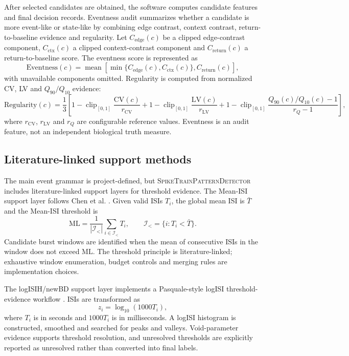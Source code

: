 \documentclass[pdflatex,sn-apa]{sn-jnl}
\newcommand{\stpd}{\textsc{SpikeTrainPatternDetector}}
\begin{document}
After selected candidates are obtained, the software computes candidate features and final decision records. Eventness audit summarizes whether a candidate is more event-like or state-like by combining edge contrast, context contrast, return-to-baseline evidence and regularity. Let $C_{\mathrm{edge}}(c)$ be a clipped edge-contrast component, $C_{\mathrm{ctx}}(c)$ a clipped context-contrast component and $C_{\mathrm{return}}(c)$ a return-to-baseline score. The eventness score is represented as
\begin{equation}
    \mathrm{Eventness}(c)
    =
    \operatorname{mean}
    \left[
    \min\{C_{\mathrm{edge}}(c),C_{\mathrm{ctx}}(c)\},
    C_{\mathrm{return}}(c)
    \right],
\end{equation}
with unavailable components omitted. Regularity is computed from normalized CV, LV and $Q_{90}/Q_{10}$ evidence:
\begin{equation}
    \mathrm{Regularity}(c)=
    \frac{1}{3}
    \left[
    1-\operatorname{clip}_{[0,1]}\frac{\mathrm{CV}(c)}{r_{\mathrm{CV}}}
    +
    1-\operatorname{clip}_{[0,1]}\frac{\mathrm{LV}(c)}{r_{\mathrm{LV}}}
    +
    1-\operatorname{clip}_{[0,1]}\frac{Q_{90}(c)/Q_{10}(c)-1}{r_Q-1}
    \right],
\end{equation}
where $r_{\mathrm{CV}}$, $r_{\mathrm{LV}}$ and $r_Q$ are configurable reference values. Eventness is an audit feature, not an independent biological truth measure.

\subsection{Literature-linked support methods}

The main event grammar is project-defined, but \stpd{} includes literature-linked support layers for threshold evidence. The Mean-ISI support layer follows Chen et al. \citep{Chen2009}. Given valid ISIs $T_i$, the global mean ISI is $\bar{T}$ and the Mean-ISI threshold is
\begin{equation}
    \mathrm{ML}
    =
    \frac{1}{|\mathcal{I}_{<}|}
    \sum_{i\in \mathcal{I}_{<}} T_i,
    \qquad
    \mathcal{I}_{<}=\{i:T_i<\bar{T}\}.
\end{equation}
Candidate burst windows are identified when the mean of consecutive ISIs in the window does not exceed $\mathrm{ML}$. The threshold principle is literature-linked; exhaustive window enumeration, budget controls and merging rules are implementation choices.

The logISIH/newBD support layer implements a Pasquale-style logISI threshold-evidence workflow \citep{Pasquale2010}. ISIs are transformed as
\begin{equation}
    z_i = \log_{10}(1000T_i),
\end{equation}
where $T_i$ is in seconds and $1000T_i$ is in milliseconds. A logISI histogram is constructed, smoothed and searched for peaks and valleys. Void-parameter evidence supports threshold resolution, and unresolved thresholds are explicitly reported as unresolved rather than converted into final labels.
\end{document}

